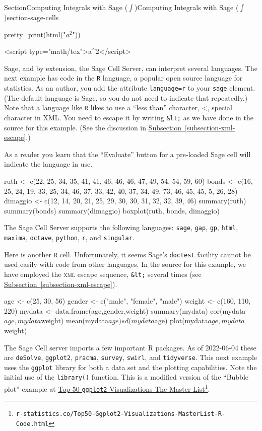 \documentclass[twoside,10pt,]{article}
\newcommand{\xreffont}{\relax}
\newcommand{\mono}[1]{\texttt{#1}}
\newcommand{\initialism}[1]{\textsc{\MakeLowercase{#1}}}
\numberwithin{equation}{section}
\begin{document}
\begin{sectionptx}{Section}{Computing Integrals with Sage (\(\int\))}{}{Computing Integrals with Sage (\(\int\))}{}{}{section-sage-cells}
\begin{sageinput}
pretty_print(html("$a^2$"))
\end{sageinput}
\begin{sageoutput}
<script type="math/tex">a^2</script>
\end{sageoutput}
Sage, and by extension, the Sage Cell Server, can interpret several languages.  The next example has code in the \mono{R} language, a popular open source language for statistics.  As an author, you add the attribute \mono{language=\textquotedbl{}r\textquotedbl{}} to your \mono{sage} element.  (The default language is Sage, so you do not need to indicate that repeatedly.)  Note that a language like \mono{R} likes to use a ``less than'' character, \textless{}, special character in XML.  You need to escape it by writing \mono{\&lt;} as we have done in the source for this example.  (See the discussion in \hyperref[subsection-xml-escape]{Subsection~{\xreffont\ref{subsection-xml-escape}}}.)%
\par
As a reader you learn that the ``Evaluate'' button for a pre-loaded Sage cell will indicate the language in use.%
\begin{sageinput}
ruth <- c(22, 25, 34, 35, 41, 41, 46, 46, 46, 47, 49, 54, 54, 59, 60)
bonds <- c(16, 25, 24, 19, 33, 25, 34, 46, 37, 33, 42, 40, 37, 34, 49, 73, 46, 45, 45, 5, 26, 28)
dimaggio <- c(12, 14, 20, 21, 25, 29, 30, 30, 31, 32, 32, 39, 46)
summary(ruth)
summary(bonds)
summary(dimaggio)
boxplot(ruth, bonds, dimaggio)
\end{sageinput}
The Sage Cell Server supports the following languages:  \mono{sage}, \mono{gap}, \mono{gp}, \mono{html}, \mono{maxima}, \mono{octave}, \mono{python}, \mono{r}, and \mono{singular}.%
\par
Here is another \mono{R} cell.  Unfortunately, it seems Sage's \mono{doctest} facility cannot be used easily with code from other languages.  In the source for this example, we have employed the \initialism{XML} escape sequence, \mono{\&lt;} several times (see \hyperref[subsection-xml-escape]{Subsection~{\xreffont\ref{subsection-xml-escape}}}).%
\begin{sageinput}
age <- c(25, 30, 56)
gender <- c("male", "female", "male")
weight <- c(160, 110, 220)
mydata <- data.frame(age,gender,weight)
summary(mydata)
cor(mydata$age,mydata$weight)
mean(mydata$age)
sd(mydata$age)
plot(mydata$age,mydata$weight)
\end{sageinput}
The Sage Cell server imports a few important R packages.  As of 2022-06-04 these are \mono{deSolve}, \mono{ggplot2}, \mono{pracma}, \mono{survey}, \mono{swirl}, and \mono{tidyverse}.  This next example uses the \mono{ggplot} library for both a data set and the plotting capabilities.  Note the initial use of the \mono{library()} function.  This is a modified version of the ``Bubble plot'' example at \href{http://r-statistics.co/Top50-Ggplot2-Visualizations-MasterList-R-Code.html}{Top 50 \mono{ggplot2} Visualizations \textemdash{}The Master List}\footnote{\nolinkurl{r-statistics.co/Top50-Ggplot2-Visualizations-MasterList-R-Code.html}\label{section-sage-cells-58-11}}.%

\end{sectionptx}
\end{document}
